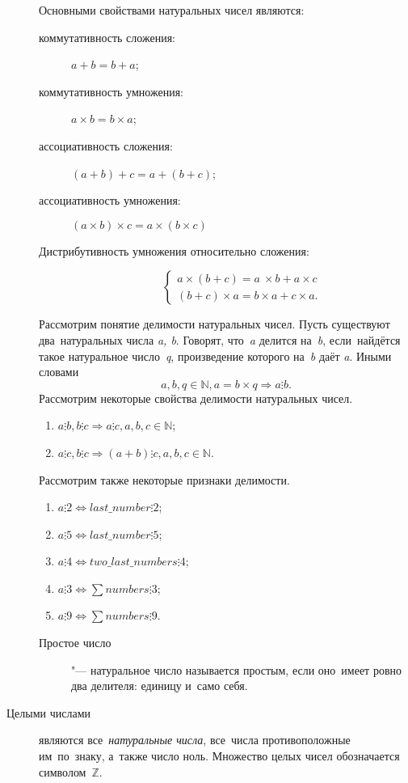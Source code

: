 \documentclass[]{scrartcl}
\begin{document}
\begin{description}
Основными свойствами натуральных чисел являются:
\begin{description}
	\item[коммутативность сложения:] ${\textstyle a+b=b+a}$;
	\item[коммутативность умножения:] ${\textstyle a \times b = b \times a}$;
	\item[ассоциативность сложения:] ${\textstyle (a+b)+c=a+(b+c)}$;
	\item[ассоциативность умножения:] ${\textstyle (a \times b) \times c=a \times (b \times c)}$
	\item[Дистрибутивность умножения относительно сложения:]
		\begin{equation}
			\begin{cases}
			a \times (b+c) = a\ \times b + a \times c\\
			(b+c) \times a = b \times a + c \times a.
			\end{cases}
		\end{equation}
\end{description}
Рассмотрим понятие делимости натуральных чисел. Пусть существуют два~натуральных числа \textit{a, b}. Говорят, что~\textit{a} делится на~\textit{b}, если~найдётся такое натуральное число~\textit{q}, произведение которого на~\textit{b} даёт \textit{a}. Иными словами
\begin{equation}\label{eq:natural-numbers-divisibility}
a,b,q \in \mathbb{N}, a=b\times q \Rightarrow a \vdots b.
\end{equation}
Рассмотрим некоторые свойства делимости натуральных чисел.
\begin{enumerate}
	\item ${\textstyle a \vdots b, b \vdots c \Rightarrow a \vdots c, a,b,c \in \mathbb{N}}$;
	\item ${\textstyle a \vdots c, b \vdots c \Rightarrow (a+b) \vdots c, a,b,c \in \mathbb{N}}$.
\end{enumerate}
Рассмотрим также некоторые признаки делимости.
\begin{enumerate}
	\item ${\textstyle a \vdots 2 \Leftrightarrow last\_number \vdots 2}$;
	\item ${\textstyle a \vdots 5 \Leftrightarrow last\_number \vdots 5}$;
	\item ${\textstyle a \vdots 4 \Leftrightarrow two\_last\_numbers \vdots 4}$;
	\item ${\textstyle a \vdots 3 \Leftrightarrow \sum{numbers} \vdots 3}$;
	\item ${\textstyle a \vdots 9 \Leftrightarrow \sum{numbers} \vdots 9}$.
\end{enumerate}
\begin{description}
	\item[Простое число] "--- натуральное число называется простым, если оно~имеет ровно два делителя: единицу и~само себя.
\end{description}
	\item[Целыми числами] являются все~\emph{натуральные числа}, все~числа противоположные им~по~знаку, а~также число ноль. Множество целых чисел обозначается символом~$\mathbb{Z}$.
		

\end{description}
\end{document}
